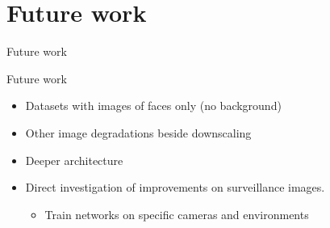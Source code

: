 \section{Future work}
\begin{frame}{Future work}{}
    \begin{block}{Future work}
        \begin{itemize}
            \item Datasets with images of faces only (no background) 
            \item Other image degradations beside downscaling
            \item Deeper architecture
            \item Direct investigation of improvements on surveillance images.
                \begin{itemize}
                    \item Train networks on specific cameras and environments
                \end{itemize}
        \end{itemize}
    \end{block}
\end{frame}

